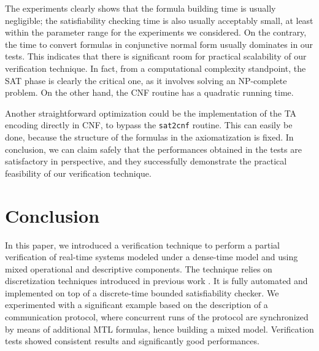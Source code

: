 \documentclass[a4paper]{article}
\theoremstyle{plain}
\theoremstyle{definition}
\begin{document}
The experiments clearly shows that the formula building time is usually negligible; the satisfiability checking time is also usually acceptably small, at least within the parameter range for the experiments we considered.
On the contrary, the time to convert formulas in conjunctive normal form usually dominates in our tests.
This indicates that there is significant room for practical scalability of our verification technique.
In fact, from a computational complexity standpoint, the SAT phase is clearly the critical one, as it involves solving an NP-complete problem.
On the other hand, the CNF routine has a quadratic running time.

Another straightforward optimization could be the implementation of the TA encoding directly in CNF, to bypass the \verb+sat2cnf+ routine.
This can easily be done, because the structure of the formulas in the axiomatization is fixed.
In conclusion, we can claim safely that the performances obtained in the tests are satisfactory in perspective, and they successfully demonstrate the practical feasibility of our verification technique.





\section{Conclusion} \label{sec:conclusions}
In this paper, we introduced a verification technique to perform a partial verification of real-time systems modeled under a dense-time model and using mixed operational and descriptive components.
The technique relies on discretization techniques introduced in previous work \cite{FPR08-FM08}.
It is fully automated and implemented on top of a discrete-time bounded satisfiability checker.
We experimented with a significant example based on the description of a
communication protocol, where concurrent runs of the protocol are synchronized by means of additional MTL formulas, hence building a mixed model.
Verification tests showed consistent results and significantly good performances.
\end{document}
